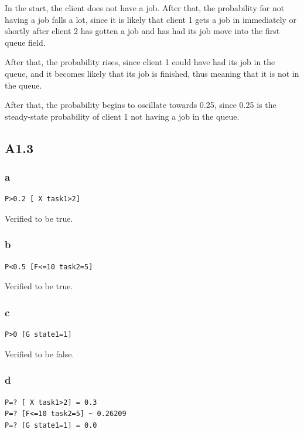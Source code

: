 In the start, the client does not have a job.
After that, the probability for not having a job falls a lot,
since it is likely that client 1 gets a job in immediately
or shortly after client 2 has gotten a job and has had its
job move into the first queue field.

After that, the probability rises, since client 1 could
have had its job in the queue, and it becomes likely that
its job is finished, thus meaning that it is not in the queue.

After that, the probability begins to oscillate towards 0.25,
since 0.25 is the steady-state probability of client 1 not having a job in the queue.

\subsection{A1.3}

\subsubsection{a}

\begin{verbatim}
P>0.2 [ X task1>2]
\end{verbatim}

Verified to be true.

\subsubsection{b}

\begin{verbatim}
P<0.5 [F<=10 task2=5]
\end{verbatim}

Verified to be true.

\subsubsection{c}

\begin{verbatim}
P>0 [G state1=1]
\end{verbatim}

Verified to be false.

\subsubsection{d}

\begin{verbatim}
P=? [ X task1>2] = 0.3
P=? [F<=10 task2=5] ~ 0.26209
P=? [G state1=1] = 0.0
\end{verbatim}

